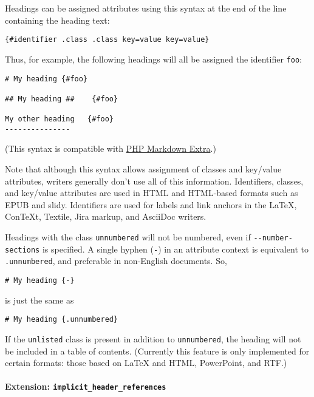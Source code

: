 Headings can be assigned attributes using this syntax at the end of the
line containing the heading text:

\begin{verbatim}
{#identifier .class .class key=value key=value}
\end{verbatim}

Thus, for example, the following headings will all be assigned the
identifier \texttt{foo}:

\begin{verbatim}
# My heading {#foo}

## My heading ##    {#foo}

My other heading   {#foo}
---------------
\end{verbatim}

(This syntax is compatible with
\href{https://michelf.ca/projects/php-markdown/extra/}{PHP Markdown
Extra}.)

Note that although this syntax allows assignment of classes and
key/value attributes, writers generally don't use all of this
information. Identifiers, classes, and key/value attributes are used in
HTML and HTML-based formats such as EPUB and slidy. Identifiers are used
for labels and link anchors in the LaTeX, ConTeXt, Textile, Jira markup,
and AsciiDoc writers.

Headings with the class \texttt{unnumbered} will not be numbered, even
if \texttt{-\/-number-sections} is specified. A single hyphen
(\texttt{-}) in an attribute context is equivalent to
\texttt{.unnumbered}, and preferable in non-English documents. So,

\begin{verbatim}
# My heading {-}
\end{verbatim}

is just the same as

\begin{verbatim}
# My heading {.unnumbered}
\end{verbatim}

If the \texttt{unlisted} class is present in addition to
\texttt{unnumbered}, the heading will not be included in a table of
contents. (Currently this feature is only implemented for certain
formats: those based on LaTeX and HTML, PowerPoint, and RTF.)

\hypertarget{extension-implicit_header_references}{%
\paragraph{\texorpdfstring{Extension:
\texttt{implicit\_header\_references}}{Extension: implicit\_header\_references}}\label{extension-implicit_header_references}}

